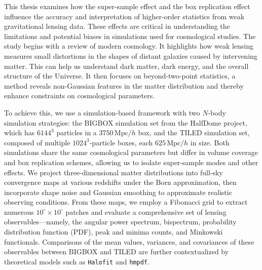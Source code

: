 This thesis examines how the super-sample effect and the box replication effect influence the accuracy and interpretation of higher-order statistics from weak gravitational lensing data. These effects are critical in understanding the limitations and potential biases in simulations used for cosmological studies. The study begins with a review of modern cosmology. It highlights how weak lensing measures small distortions in the shapes of distant galaxies caused by intervening matter. This can help us understand dark matter, dark energy, and the overall structure of the Universe. It then focuses on beyond-two-point statistics, a method reveals non-Gaussian features in the matter distribution and thereby enhance constraints on cosmological parameters.

To achieve this, we use a simulation-based framework with two $N$-body simulation strategies: the BIGBOX simulation set from the HalfDome project, which has $6144^3$ particles in a $3750\, \mathrm{Mpc}/h$ box, and the TILED simulation set, composed of multiple $1024^3$-particle boxes, each $625\, \mathrm{Mpc}/h$ in size. Both simulations share the same cosmological parameters but differ in volume coverage and box replication schemes, allowing us to isolate super-sample modes and other effects. We project three-dimensional matter distributions into full-sky convergence maps at various redshifts under the Born approximation, then incorporate shape noise and Gaussian smoothing to approximate realistic observing conditions. From these maps, we employ a Fibonacci grid to extract numerous $10^\circ \times 10^\circ$ patches and evaluate a comprehensive set of lensing observables—namely, the angular power spectrum, bispectrum, probability distribution function (PDF), peak and minima counts, and Minkowski functionals. Comparisons of the mean values, variances, and covariances of these observables between BIGBOX and TILED are further contextualized by theoretical models such as \texttt{Halofit} and \texttt{hmpdf}.


